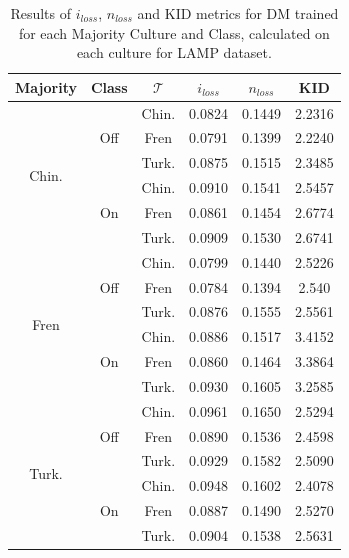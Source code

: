 \begin{table}[]
\centering
\begin{tabular}{c|c|c|c|c|c}
    \textbf{Majority} & \textbf{Class} & \textbf{$\mathcal{T}$} & \textbf{$i_{loss}$} & \textbf{$n_{loss}$} & \textbf{KID} \\
    \toprule
\multirow{6}{*}{Chin.} & \multirow{3}{*}{Off} & Chin. & 0.0824 & 0.1449 & 2.2316 \\
 &  & Fren & 0.0791 & 0.1399 & 2.2240  \\
 &  & Turk. & 0.0875 & 0.1515 & 2.3485  \\
\hhline{~-----}
 & \multirow{3}{*}{On} & Chin. & 0.0910 & 0.1541 & 2.5457  \\
 &  & Fren & 0.0861 & 0.1454 & 2.6774  \\
 &  & Turk. & 0.0909 & 0.1530 & 2.6741 \\
\midrule
\multirow{6}{*}{Fren} & \multirow{3}{*}{Off} & Chin. & 0.0799 & 0.1440 & 2.5226  \\
 &  & Fren & 0.0784 & 0.1394 & 2.540  \\
 &  & Turk. & 0.0876 & 0.1555 & 2.5561 \\
\hhline{~-----}
 & \multirow{3}{*}{On} & Chin. & 0.0886 & 0.1517 & 3.4152  \\
 &  & Fren & 0.0860 & 0.1464 & 3.3864  \\
 &  & Turk. & 0.0930 & 0.1605 & 3.2585 \\
\midrule
\multirow{6}{*}{Turk.} & \multirow{3}{*}{Off} & Chin. & 0.0961 & 0.1650 & 2.5294  \\
 &  & Fren & 0.0890 & 0.1536 & 2.4598  \\
 &  & Turk. & 0.0929 & 0.1582 & 2.5090  \\
\hhline{~-----}
 & \multirow{3}{*}{On} & Chin. & 0.0948 & 0.1602 & 2.4078 \\
 &  & Fren & 0.0887 & 0.1490 & 2.5270 \\
 &  & Turk. & 0.0904 & 0.1538 & 2.5631  \\
\bottomrule
    \end{tabular}
    \caption{Results of $i_{loss}$, $n_{loss}$ and KID metrics for DM trained for each Majority Culture and Class, calculated on each culture for LAMP dataset.}
    \label{ch3:tab:genDM}
\end{table}
%
%
